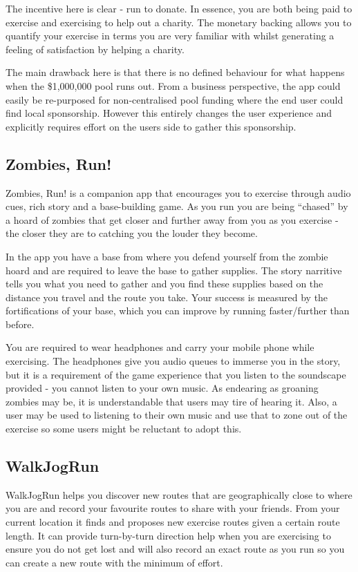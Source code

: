 The incentive here is clear - run to donate. In essence, you are both
being paid to exercise and exercising to help out a charity. The
monetary backing allows you to quantify your exercise in terms you are
very familiar with whilst generating a feeling of satisfaction by
helping a charity.

The main drawback here is that there is no defined behaviour for what
happens when the \$1,000,000 pool runs out. From a business
perspective, the app could easily be re-purposed for non-centralised
pool funding where the end user could find local sponsorship. However
this entirely changes the user experience and explicitly requires
effort on the users side to gather this sponsorship. 

\subsection{Zombies, Run!}
\label{sec:zombies}
Zombies, Run! is a companion app that encourages you to exercise through
audio cues, rich story and a base-building game. As you run you are
being ``chased'' by a hoard of zombies that get closer and further
away from you as you exercise - the closer they are to catching you
the louder they become. 

In the app you have a base from where you defend yourself from the
zombie hoard and are required to leave the base to gather
supplies. The story narritive tells you what you need to gather and
you find these supplies based on the distance you travel and the route
you take. Your success is measured by the fortifications of your base,
which you can improve by running faster/further than before.

You are required to wear headphones and carry your mobile phone while
exercising. The headphones give you audio queues to immerse you in the
story, but it is a requirement of the game experience that you listen
to the soundscape provided - you cannot listen to your own music. As
endearing as groaning zombies may be, it is understandable that users
may tire of hearing it. Also, a user may be used to listening to their
own music and use that to zone out of the exercise so some users might
be reluctant to adopt this.


\subsection{WalkJogRun}
\label{sec:walkjogrun}
WalkJogRun helps you discover new routes that are geographically
close to where you are and record your favourite routes to share with
your friends. From your current location it finds and
proposes new exercise routes given a certain route length. It can
provide turn-by-turn direction help when you are exercising to ensure
you do not get lost and will also record an exact route as you run so
you can create a new route with the minimum of effort. 

